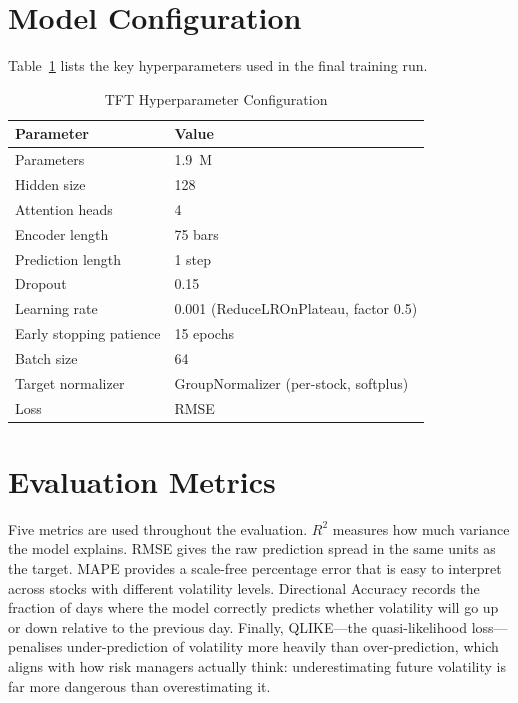 \section{Model Configuration}

Table~\ref{tab:config} lists the key hyperparameters used in the final training run.

\begin{table}[h!]
\caption{TFT Hyperparameter Configuration}
\label{tab:config}
\centering
\begin{tabular}{ll}
\hline
\textbf{Parameter} & \textbf{Value} \\
\hline
Parameters & 1.9~M \\
Hidden size & 128 \\
Attention heads & 4 \\
Encoder length & 75 bars \\
Prediction length & 1 step \\
Dropout & 0.15 \\
Learning rate & 0.001 (ReduceLROnPlateau, factor 0.5) \\
Early stopping patience & 15 epochs \\
Batch size & 64 \\
Target normalizer & GroupNormalizer (per-stock, softplus) \\
Loss & RMSE \\
\hline
\end{tabular}
\end{table}

\section{Evaluation Metrics}

Five metrics are used throughout the evaluation. $R^2$ measures how much variance the model explains. RMSE gives the raw prediction spread in the same units as the target. MAPE provides a scale-free percentage error that is easy to interpret across stocks with different volatility levels. Directional Accuracy records the fraction of days where the model correctly predicts whether volatility will go up or down relative to the previous day. Finally, QLIKE---the quasi-likelihood loss---penalises under-prediction of volatility more heavily than over-prediction, which aligns with how risk managers actually think: underestimating future volatility is far more dangerous than overestimating it.
